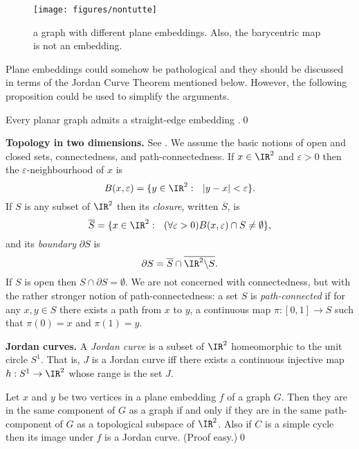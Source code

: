 \begin{figure}
\centerline{
\texttt{[image: figures/nontutte]}}
\caption{a graph with different plane embeddings. Also, the
barycentric map is not an embedding.}
\label{nontutte.fig}
\end{figure}

Plane embeddings could somehow be pathological
and they should be discussed in terms of
the Jordan Curve Theorem mentioned below.
However, the following proposition could be used
to simplify the arguments.

\begin{proposition}
\label{straight-edge embeddings} Every planar graph
admits a straight-edge
embedding {\rm \cite{dpp,od94,read}}.\qed
\end{proposition}

\numpara
\label{topology in two dimensions} {\bf Topology in two dimensions.} See \cite{moise,stillwell}.
We assume the basic notions
of open and closed sets, connectedness, and path-connectedness.
If $x\in \IR^2$ and $\varepsilon > 0$ then the
$\varepsilon$-neighbourhood of $x$ is
$$ B(x,\varepsilon) = \{ y \in \IR^2:~~ |y-x| < \varepsilon\}.$$
If $S$ is any subset of $\IR^2$ then
its {\em closure}, written $\overline{S}$, is
$$ \overline{S} =
\{ x\in\IR^2:~~ (\forall \varepsilon>0)
B(x,\varepsilon)\cap S \not=\emptyset\},$$ and
its {\em boundary} $\partial S$ is
$$\partial S = \overline{S}\cap\overline{\IR^2\backslash S}.$$ If $S$
is open then $S\cap \partial S = \emptyset$. We
are not concerned with connectedness, but with the
rather stronger notion of path-connectedness:
a set $S$
is {\em path-connected} if for any $x,y\in S$
there exists a path from $x$ to $y$, a continuous map $\pi:[0,1]\to S$
such that $\pi(0) = x$ and $\pi(1) = y$.

\numpara
\label{Jordan curves} {\bf Jordan curves.} A {\em Jordan curve} is a subset of
$\IR^2$ homeomorphic to the unit circle $S^1$.
That is, $J$ is a Jordan
curve iff there exists a continuous injective map $h: S^1 \to \IR^2$
whose range is the set $J$.


\begin{proposition}
\label{path components in graph and plane} Let $x$ and $y$ be two vertices in a plane embedding $f$ of
a graph $G$.  Then they are in the same component
of $G$ as a graph if and only if they are in
the same path-component of $G$ as a topological
subspace of $\IR^2$. Also if $C$ is a simple cycle then
its image under
$f$ is a Jordan curve.  (Proof easy.)\qed
\end{proposition}



